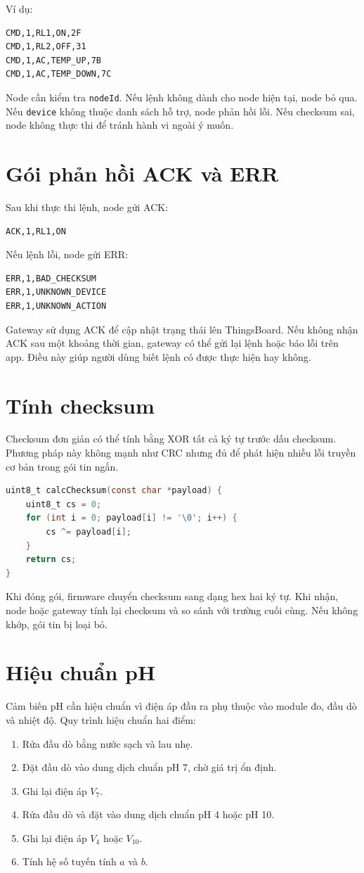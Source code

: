 Ví dụ:
\begin{lstlisting}
CMD,1,RL1,ON,2F
CMD,1,RL2,OFF,31
CMD,1,AC,TEMP_UP,7B
CMD,1,AC,TEMP_DOWN,7C
\end{lstlisting}

Node cần kiểm tra \texttt{nodeId}. Nếu lệnh không dành cho node hiện tại, node bỏ qua. Nếu \texttt{device} không thuộc danh sách hỗ trợ, node phản hồi lỗi. Nếu checksum sai, node không thực thi để tránh hành vi ngoài ý muốn.

\section{Gói phản hồi ACK và ERR}
Sau khi thực thi lệnh, node gửi ACK:
\begin{lstlisting}
ACK,1,RL1,ON
\end{lstlisting}

Nếu lệnh lỗi, node gửi ERR:
\begin{lstlisting}
ERR,1,BAD_CHECKSUM
ERR,1,UNKNOWN_DEVICE
ERR,1,UNKNOWN_ACTION
\end{lstlisting}

Gateway sử dụng ACK để cập nhật trạng thái lên ThingsBoard. Nếu không nhận ACK sau một khoảng thời gian, gateway có thể gửi lại lệnh hoặc báo lỗi trên app. Điều này giúp người dùng biết lệnh có được thực hiện hay không.

\section{Tính checksum}
Checksum đơn giản có thể tính bằng XOR tất cả ký tự trước dấu checksum. Phương pháp này không mạnh như CRC nhưng đủ để phát hiện nhiều lỗi truyền cơ bản trong gói tin ngắn.

\begin{lstlisting}[language=C,caption={Ví dụ tính checksum XOR}]
uint8_t calcChecksum(const char *payload) {
    uint8_t cs = 0;
    for (int i = 0; payload[i] != '\0'; i++) {
        cs ^= payload[i];
    }
    return cs;
}
\end{lstlisting}

Khi đóng gói, firmware chuyển checksum sang dạng hex hai ký tự. Khi nhận, node hoặc gateway tính lại checksum và so sánh với trường cuối cùng. Nếu không khớp, gói tin bị loại bỏ.

\section{Hiệu chuẩn pH}
Cảm biến pH cần hiệu chuẩn vì điện áp đầu ra phụ thuộc vào module đo, đầu dò và nhiệt độ. Quy trình hiệu chuẩn hai điểm:
\begin{enumerate}
    \item Rửa đầu dò bằng nước sạch và lau nhẹ.
    \item Đặt đầu dò vào dung dịch chuẩn pH 7, chờ giá trị ổn định.
    \item Ghi lại điện áp $V_7$.
    \item Rửa đầu dò và đặt vào dung dịch chuẩn pH 4 hoặc pH 10.
    \item Ghi lại điện áp $V_4$ hoặc $V_{10}$.
    \item Tính hệ số tuyến tính $a$ và $b$.
\end{enumerate}

